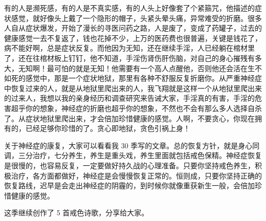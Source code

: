 \documentclass{ctexart}
\begin{document}
有的人是濒死感，有的人是不真实感，有的人头上好像套了个紧箍咒，他描述的症状感觉，就好像头上戴了一个隐形的帽子，头紧头晕头痛，异常难受的折磨。很多人自从症状爆发，开始了漫长的寻医问药之路，人是废了，变成了药罐子，过去的健康感觉一去不复返了，钱也花掉不少，上万的医药费也很普遍，关键是钱花了，病不能好啊，总是症状反复。而他因为无知，还在继续手淫，人已经躺在棺材里了，还在往棺材板上钉钉，他不知道，手淫伤肾伤肝伤脑，对自己的身心摧残有多大，无知啊！最可怕的就是无知！他需要有一个高人点醒他，否则他还会活在生不如死的感觉中，那是一个症状地狱，那里有各种不舒服反复折磨你。从严重神经症中恢复过来的人，就是从地狱里爬出来的人，我飞翔就是这样一个从地狱里爬出来的过来人，我想以我的亲身经历和调查研究来告诫大家，手淫真的有害，手淫的危害超乎你的想象，神经症的折磨也超乎你的想象，不然也不会有那么多人选择自杀了。从症状地狱里爬出来，才会倍加珍惜健康的感觉。人啊，不要贪心，你现在拥有的，已经足够你珍惜的了。贪心即地狱，贪色引祸上身！

关于神经症的康复，大家可以看看我 30 季写的文章。总的恢复方针，就是身心同调，三分治疗，七分养生，养生是重头戏，养生里面就包括戒色保精。神经症恢复是很慢的，也容易反复，一定要做好持久战的心理准备。只要你坚持戒色养生，积极治疗，各方面都做好，神经症是会慢慢恢复正常的。恒则成，只要你坚持正确的恢复路线，迟早是会走出神经症的阴霾的，到时候你就像重获新生一般，会倍加珍惜健康的感觉。

这季继续创作了 5 首戒色诗歌，分享给大家。
\end{document}
